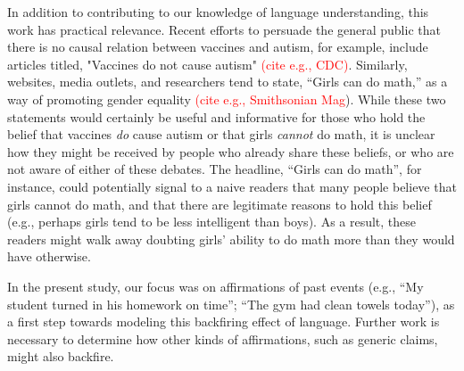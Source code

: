 \documentclass[10pt,letterpaper]{article}
\newcommand{\red}[1]{\textcolor{Red}{#1}}
\begin{document}
In addition to contributing to our knowledge of language understanding, this work has practical relevance.  
Recent efforts to persuade the general public that there is no causal relation between vaccines and autism, for example, include articles titled, "Vaccines do not cause autism" \red{(cite e.g., CDC)}.  
Similarly, websites, media outlets, and researchers tend to state, ``Girls can do math,'' as a way of promoting gender equality \red{(cite e.g., Smithsonian Mag}).  
While these two statements would certainly be useful and informative for those who hold the belief that vaccines \emph{do} cause autism or that girls \emph{cannot} do math, it is unclear how they might be received by people who already share these beliefs, or who are not aware of either of these debates.  
The headline, ``Girls can do math'', for instance, could potentially signal to a naive readers that many people believe that girls cannot do math, and that there are legitimate reasons to hold this belief (e.g., perhaps girls tend to be less intelligent than boys).  
As a result, these readers might walk away doubting girls' ability to do math more than they would have otherwise.

In the present study, our focus was on affirmations of past events (e.g., ``My student turned in his homework on time''; ``The gym had clean towels today''), as a first step towards modeling this backfiring effect of language.  
Further work is necessary to determine how other kinds of affirmations, such as generic claims, might also backfire.





\setlength{\bibleftmargin}{.125in}
\setlength{\bibindent}{-\bibleftmargin}


\end{document}
